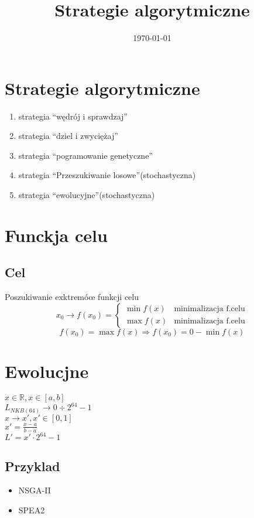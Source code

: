 \documentclass[11pt]{article}
\date{\today}
\title{Strategie algorytmiczne}
\begin{document}
\maketitle
\tableofcontents

\section{Strategie algorytmiczne}
\label{sec:org3dcdd7a}
\begin{enumerate}
\item strategia ``wędrój i sprawdzaj''
\item strategia ``dziel i zwyciężaj''
\item strategia ``pogramowanie genetyczne''
\item strategia ``Przeszukiwanie losowe''(stochastyczna)
\item strategia ``ewolucyjne''(stochastyczna)
\end{enumerate}
\section{Funckja celu}
\label{sec:orgadc682c}
\subsection{Cel}
\label{sec:org27f2d26}
Poszukiwanie exktremóœ funkcji celu
$$x_0 \to f(x_0) = \begin{cases}
                     \min f(x) & \text{minimalizacja f.celu}\\
                     \max f(x) & \text{minimalizacja f.celu}
\end{cases}$$
$$f(x_0) = \max f(x) \Rightarrow f(x_0) = 0 - \min f(x)$$
\section{Ewolucjne}
\label{sec:org87876a5}
\(x \in \mathbb{R}, x \in [a,b]\)
\\\empty
\(L_{NKB(64)} \to 0 \div 2^{64}-1\)
\\\empty
\(x \to x', x'\in [0,1]\)
\\\empty
\(x'= \frac{x-a}{b-a}\)
\\\empty
\(L' = x' \cdot 2^{64}-1\)
\subsection{Przyklad}
\label{sec:org4333160}
\begin{itemize}
\item NSGA-II
\item SPEA2
\end{itemize}
\end{document}
